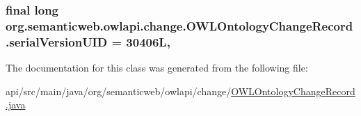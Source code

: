 \hypertarget{classorg_1_1semanticweb_1_1owlapi_1_1change_1_1_o_w_l_ontology_change_record_a69f87f9c0ff9ca7e99ede6deb957ff7e}{
\subsubsection[{serial\-Version\-U\-I\-D}]{\setlength{\rightskip}{0pt plus 5cm}final long org.\-semanticweb.\-owlapi.\-change.\-O\-W\-L\-Ontology\-Change\-Record.\-serial\-Version\-U\-I\-D = 30406\-L\hspace{0.3cm}{\ttfamily [static]}, {\ttfamily [private]}}}\label{classorg_1_1semanticweb_1_1owlapi_1_1change_1_1_o_w_l_ontology_change_record_a69f87f9c0ff9ca7e99ede6deb957ff7e}


The documentation for this class was generated from the following file\-:\begin{DoxyCompactItemize}
\item 
api/src/main/java/org/semanticweb/owlapi/change/\hyperlink{_o_w_l_ontology_change_record_8java}{O\-W\-L\-Ontology\-Change\-Record.\-java}\end{DoxyCompactItemize}

